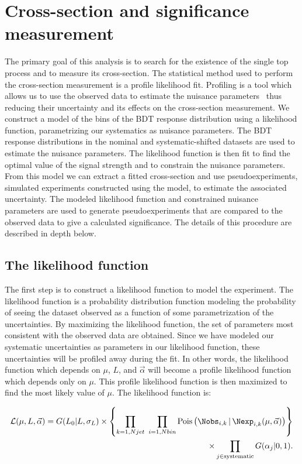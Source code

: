 \section{Cross-section and significance measurement}

The primary goal of this analysis is to search for the existence of the single top \Wtchan process and to measure its cross-section. The statistical method used to perform the cross-section measurement is a profile likelihood fit. Profiling is a tool which allows us to use the observed data to estimate the nuisance parameters~\cite{PLRcite,ProfileWiki} thus reducing their uncertainty and its effects on the cross-section measurement. We construct a model of the bins of the BDT response distribution using a likelihood function, parametrizing our systematics as nuisance parameters. The BDT response distributions in the nominal and systematic-shifted datasets are used to estimate the nuisance parameters. The likelihood function is then fit to find the optimal value of the signal strength and to constrain the nuisance parameters. From this model we can extract a fitted cross-section and use pseudoexperiments, simulated experiments constructed using the model, to estimate the associated uncertainty. The modeled likelihood function and constrained nuisance parameters are used to generate pseudoexperiments that are compared to the observed data to give a calculated significance. The details of this procedure are described in depth below.

\subsection{The likelihood function}
The first step is to construct a likelihood function to model the experiment. The likelihood function is a probability distribution function modeling the probability of seeing the dataset observed as a function of some parametrization of the uncertainties. By maximizing the likelihood function, the set of parameters most consistent with the observed data are obtained. Since we have modeled our systematic uncertainties as parameters in our likelihood function, these uncertainties will be profiled away during the fit. In other words, the likelihood function which depends on $\mu$, $L$, and $\vec{\alpha}$ will become a profile likelihood function which depends only on $\mu$. This profile likelihood function is then maximized to find the most likely value of $\mu$. The likelihood function is:

\begin{equation}
\begin{split}
\mathcal{L}(\mu, L, \vec{\alpha}) =  G(L_0 | L, \sigma_L) \times \left\{ \prod_{k=1,Njet} \  \prod_{i=1,Nbin} \text{Pois} \left (\Nobs_{i,k} \, | \, \Nexp_{i,k}(\mu,\vec{\alpha}) \right)\right\} \\
  \times \prod_{j\in \rm systematic} G(\alpha_{j}|0,1). \\
\end{split}
\end{equation}

